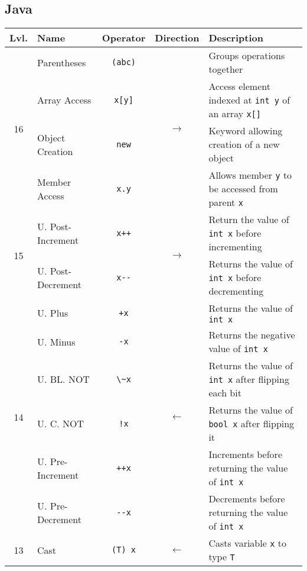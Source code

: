 \documentclass{article}
\begin{document}
\subsection{Java}
\begin{center}\begin{tabularx}{\textwidth}{clccX}\toprule
Lvl.                & \quad Name        & Operator          & Direction & \qquad Description \\\midrule

\multirow{4}{*}{16} & Parentheses       & \lstinline|(abc)| & \multirow{4}{*}{\(\to\)}& Groups operations together\\
& Array Access      & \lstinline|x[y]|  & & Access element indexed at \lstinline|int y| of an array \lstinline|x[]|\\
& Object Creation   & \lstinline|new|   & & Keyword allowing creation of a new object\\
& Member Access     & \lstinline|x.y|   & & Allows member \lstinline|y| to be accessed from parent \lstinline|x| \\ \midrule

\multirow{2}{*}{15} & U. Post-Increment & \lstinline|x++|   & \multirow{2}{*}{\(\to\)} & Return the value of \lstinline|int x| before incrementing \\
& U. Post-Decrement & \lstinline|x--|   & & Returns the value of \lstinline|int x| before decrementing\\\midrule

\multirow{6}{*}{14} & U. Plus           & \lstinline|+x|    & \multirow{6}{*}{\(\gets\)} & Returns the value of \lstinline|int x|\\
& U. Minus          & \lstinline|-x|    & & Returns the negative value of \lstinline|int x| \\
& U. BL. NOT        & \lstinline|\~x|  & & Returns the value of \lstinline|int x| after flipping each bit\\
& U. C. NOT         & \lstinline|!x|    & & Returns the value of \lstinline|bool x| after flipping it \\
& U. Pre-Increment  & \lstinline|++x|   & & Increments before returning the value of \lstinline|int x| \\
& U. Pre-Decrement  & \lstinline|--x|   & & Decrements before returning the value of \lstinline|int x| \\\midrule

13  & Cast              & \lstinline|(T) x| & \(\gets\) & Casts variable \lstinline|x| to type \lstinline|T| \\\midrule


\end{tabularx}
\end{center}
\end{document}
